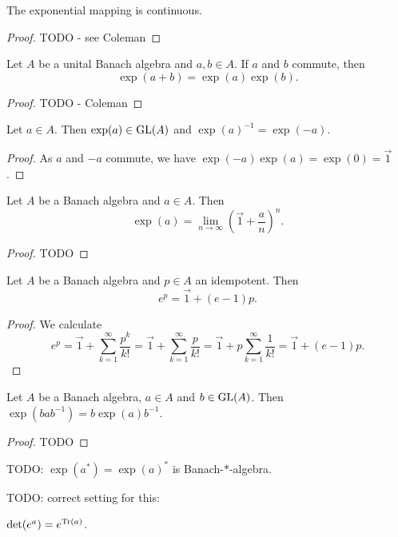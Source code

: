\begin{lemma} \label{continuityExp}
The exponential mapping is continuous.
\end{lemma}
\begin{proof}
TODO - see Coleman
\end{proof}

\begin{proposition} \label{factorisationCommutingExponentials}
Let $A$ be a unital Banach algebra and $a,b\in A$. If $a$ and $b$ commute, then
\[ \exp(a+b) = \exp(a)\exp(b). \]
\end{proposition}
\begin{proof}
TODO - Coleman
\end{proof}
\begin{corollary}
Let $a\in A$. Then $\exp(a)\in \operatorname{GL}(A)$ and $\exp(a)^{-1} = \exp(-a)$.
\end{corollary}
\begin{proof}
As $a$ and $-a$ commute, we have $\exp(-a)\exp(a) = \exp(0) = \vec{1}$.
\end{proof}

\begin{lemma}
Let $A$ be a Banach algebra and $a\in A$. Then
\[ \exp(a) = \lim_{n\to\infty} \left(\vec{1} + \frac{a}{n}\right)^n. \]
\end{lemma}
\begin{proof}
TODO
\end{proof}

\begin{lemma}
Let $A$ be a Banach algebra and $p\in A$ an idempotent. Then
\[ e^p = \vec{1} + (e-1)p. \]
\end{lemma}
\begin{proof}
We calculate
\[ e^p = \vec{1} + \sum_{k=1}^\infty \frac{p^k}{k!} = \vec{1} + \sum_{k=1}^\infty \frac{p}{k!} = \vec{1} + p\sum_{k=1}^\infty \frac{1}{k!} = \vec{1} + (e-1)p. \]
\end{proof}

\begin{lemma}
Let $A$ be a Banach algebra, $a\in A$ and $b\in \operatorname{GL}(A)$. Then $\exp(bab^{-1}) = b\exp(a)b^{-1}$.
\end{lemma}
\begin{proof}
TODO
\end{proof}

TODO: $\exp(a^*) = \exp(a)^*$ is Banach-$*$-algebra.

TODO: correct setting for this:
\begin{proposition}
$\det(e^a) = e^{\operatorname{Tr}(a)}$.
\end{proposition}



